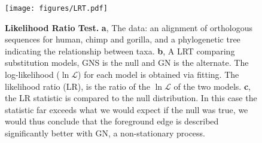 \begin{figure}[!ht]
\centering
\texttt{[image: figures/LRT.pdf]}
\caption{\textbf{Likelihood Ratio Test.} \textbf{a}, The data: an alignment of orthologous sequences for human, chimp and gorilla, and a phylogenetic tree indicating the relationship between taxa. \textbf{b}, A LRT comparing substitution models, GNS is the null and GN is the alternate. The log-likelihood ($\ln\mathcal{L}$) for each model is obtained via fitting. The likelihood ratio (LR), is the ratio of the $\ln\mathcal{L}$ of the two models. \textbf{c}, the LR statistic is compared to the null distribution. In this case the statistic far exceeds what we would expect if the null was true, we would thus conclude that the foreground edge is described significantly better with GN, a non-stationary process.}
\label{fig:lrt}
\end{figure}